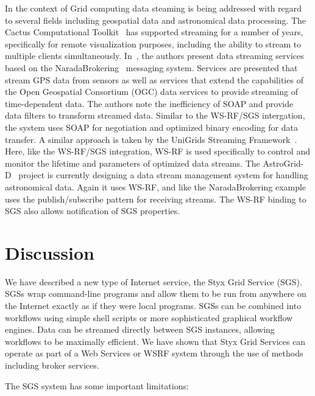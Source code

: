 \documentclass[a4paper]{article}
\begin{document}
In the context of Grid computing data steaming is being addressed with regard to several fields including geospatial data and astronomical data processing. The Cactus Computational Toolkit~\cite{allen:2001} has supported streaming for a number of years, specifically for remote visualization purposes, including the ability to stream to multiple clients simultaneously. In~\cite{fox:2006}, the authors present data streaming services based on the NaradaBrokering~\cite{naradabrokering} messaging system. Services are presented that stream GPS data from sensors as well as services that extend the capabilities of the Open Geospatial Consortium (OGC) data services to provide streaming of time-dependent data. The authors note the inefficiency of SOAP and provide data filters to transform streamed data. Similar to the WS-RF/SGS intergation, the system uses SOAP for negotiation and optimized binary encoding for data transfer. A similar approach is taken by the UniGrids Streaming Framework~\cite{benedyczak:2006}. Here, like the WS-RF/SGS integration, WS-RF is used specifically to control and monitor the lifetime and parameters of optimized data streams. The AstroGrid-D~\cite{astrogrid-d} project is currently designing a data stream management system for handling astronomical data. Again it uses WS-RF, and like the NaradaBrokering example uses the publish/subscribe pattern for receiving streams. The WS-RF binding to SGS also allows notification of SGS properties.

\section{Discussion}

We have described a new type of Internet service, the Styx Grid Service (SGS).  SGSs wrap command-line programs and allow them to be run from anywhere on the Internet exactly as if they were local programs.  SGSs can be combined into workflows using simple shell scripts or more sophisticated graphical workflow engines.  Data can be streamed directly between SGS instances, allowing workflows to be maximally efficient.  We have shown that Styx Grid Services can operate as part of a Web Services or WSRF system through the use of methods including broker services.

The SGS system has some important limitations:
\end{document}
